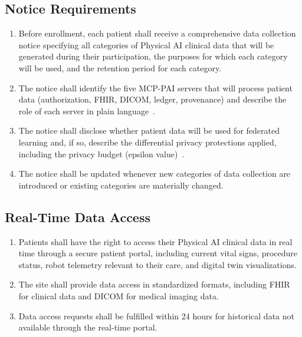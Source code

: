 \documentclass[11pt,letterpaper]{article}
\begin{document}
\subsection{Notice Requirements}

\begin{enumerate}[label=(\alph*)]
\item Before enrollment, each patient shall receive a comprehensive data
  collection notice specifying all categories of Physical AI clinical data that
  will be generated during their participation, the purposes for which each
  category will be used, and the retention period for each category.

\item The notice shall identify the five MCP-PAI servers that will process
  patient data (authorization, FHIR, DICOM, ledger, provenance) and describe
  the role of each server in plain language~\cite{iche6r3adapt}.

\item The notice shall disclose whether patient data will be used for federated
  learning and, if so, describe the differential privacy protections applied,
  including the privacy budget (epsilon value)~\cite{patientjourney2026}.

\item The notice shall be updated whenever new categories of data collection are
  introduced or existing categories are materially changed.
\end{enumerate}

\subsection{Real-Time Data Access}

\begin{enumerate}[label=(\alph*)]
\item Patients shall have the right to access their Physical AI clinical data
  in real time through a secure patient portal, including current vital signs,
  procedure status, robot telemetry relevant to their care, and digital twin
  visualizations.

\item The site shall provide data access in standardized formats, including
  FHIR for clinical data and DICOM for medical imaging data.

\item Data access requests shall be fulfilled within 24 hours for historical
  data not available through the real-time portal.
\end{enumerate}
\end{document}

